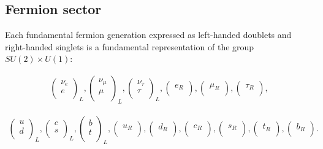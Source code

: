 \subsection{Fermion sector}
Each fundamental fermion generation expressed as left-handed doublets and right-handed singlets is a fundamental representation of the group $SU(2) \times U(1)$:

\begin{align}
\begin{pmatrix}
\nu_e  \\
e \\
\end{pmatrix}_L,
\begin{pmatrix}
\nu_{\mu}  \\
\mu \\
\end{pmatrix}_L,
\begin{pmatrix}
\nu_{\tau}  \\
\tau \\
\end{pmatrix}_L,
\begin{pmatrix}
e_R \\
\end{pmatrix},
\begin{pmatrix}
\mu_R \\
\end{pmatrix},
\begin{pmatrix}
\tau_R \\
\end{pmatrix},
\end{align}

\begin{align}
\begin{pmatrix}
u \\
d \\
\end{pmatrix}_L,
\begin{pmatrix}
c  \\
s\\
\end{pmatrix}_L,
\begin{pmatrix}
b\\
t \\
\end{pmatrix}_L,
\begin{pmatrix}
u_R \\
\end{pmatrix},
\begin{pmatrix}
d_R \\
\end{pmatrix},
\begin{pmatrix}
c_R \\
\end{pmatrix},
\begin{pmatrix}
s_R \\
\end{pmatrix},
\begin{pmatrix}
t_R \\
\end{pmatrix},
\begin{pmatrix}
b_R \\
\end{pmatrix}.
\end{align}

